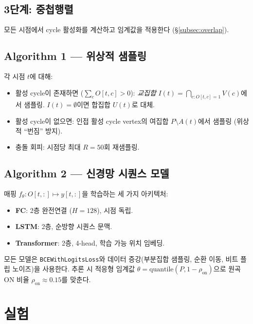 \documentclass[conference,10pt,a4paper]{IEEEtran}
\begin{document}
\subsection{3단계: 중첩행렬}
모든 시점에서 cycle 활성화를 계산하고 임계값을 적용한다
(\S\ref{subsec:overlap}).

\subsection{Algorithm 1 --- 위상적 샘플링}
\label{subsec:algo1}

각 시점 $t$에 대해:
\begin{itemize}[nosep]
\item 활성 cycle이 존재하면 ($\sum_c O[t,c] > 0$): \emph{교집합}
      $I(t) = \bigcap_{c: O[t,c]=1} V(c)$에서 샘플링.
      $I(t) = \emptyset$이면 합집합 $U(t)$로 대체.
\item 활성 cycle이 없으면: 인접 활성 cycle vertex의 여집합
      $P \setminus A(t)$에서 샘플링 (위상적 ``번짐'' 방지).
\item 충돌 회피: 시점당 최대 $R = 50$회 재샘플링.
\end{itemize}

\subsection{Algorithm 2 --- 신경망 시퀀스 모델}
\label{subsec:algo2}

매핑 $f_\theta : O[t,:] \mapsto y[t,:]$을 학습하는 세 가지
아키텍처:
\begin{itemize}[nosep]
\item \textbf{FC}: 2층 완전연결 ($H = 128$), 시점 독립.
\item \textbf{LSTM}: 2층, 순방향 시퀀스 문맥.
\item \textbf{Transformer}: 2층, 4-head, 학습 가능 위치 임베딩.
\end{itemize}

모든 모델은 \texttt{BCEWithLogitsLoss}와 데이터 증강(부분집합 샘플링,
순환 이동, 비트 플립 노이즈)을 사용한다. 추론 시 적응형 임계값
$\theta = \mathrm{quantile}(P, 1-\rho_{\mathrm{on}})$으로
원곡 ON 비율 $\rho_{\mathrm{on}} \approx 0.15$를 맞춘다.


\section{실험}
\label{sec:experiments}
\end{document}
